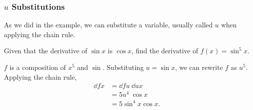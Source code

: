 \subsubsection{$u$ Substitutions}
As we did in the example, we can substitute a variable, usually called $u$ when applying the chain rule.
\begin{example}
	Given that the derivative of $\sin{x}$ is $\cos{x}$, find the derivative of $f(x)=\sin^5{x}$.
\end{example}
$f$ is a composition of $x^5$ and $\sin$.
Substituting $u=\sin{x}$, we can rewrite $f$ as $u^5$.
Applying the chain rule,
\begin{align*}
	\dd{f}{x} &= \dd{f}{u} \hspace{3pt} \dd{u}{x} \\
	&= 5u^4 \hspace{3pt} \cos{x} \\
	&= 5\sin^4{x}\cos{x}.
\end{align*}